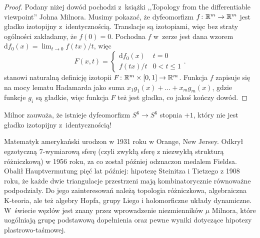\begin{proof}
    Podany niżej dowód pochodzi z~książki ,,Topology from the differentiable viewpoint'' Johna Milnora.
%
    Musimy pokazać, że dyfeomorfizm $f \colon \mathbb R^m \to \mathbb R^m$ jest gładko izotopijny z~identycznością.
    Translacje są izotopiami, więc bez straty ogólności zakładamy, że $f(0) = 0$.
    Pochodna $f$ w~zerze jest dana wzorem $\mathrm{d}f_0(x) = \lim_{t \to 0} f(tx) /t$, więc
    \begin{equation}
        F(x, t) = \begin{cases}
            \mathrm{d}f_0(x) & t = 0 \\
            f(tx) / t & 0 < t \le 1
        \end{cases} .
    \end{equation}
    stanowi naturalną definicję izotopii $F \colon \mathbb R^m \times [0, 1] \to \mathbb R^m$.
    Funkcja $f$ zapisuje się na mocy lematu Hadamarda jako suma $x_1 g_1(x) + \ldots + x_mg_m(x)$, gdzie funkcje $g_i$ są gładkie, więc funkcja $F$ też jest gładka, co jakoś kończy dowód.
%    
\end{proof}

Milnor zauważa, że istnieje dyfeomorfizm $S^6 \to S^6$ stopnia $+1$, który nie jest gładko izotopijny z~identycznością!
%

\begin{remark}
    Matematyk amerykański urodzon w 1931 roku w Orange, New Jersey.
    Odkrył egzotyczną 7-wymiarową sferę (czyli zwykłą sferę z niezwykłą strukturą różniczkową) w 1956 roku, za co został później odznaczon medalem Fieldsa.
    Obalił Hauptvermutung pięć lat później: hipotezę Steinitza i Tietzego z 1908 roku, że każde dwie triangulacje przestrzeni mają kombinatorycznie równoważne podpodziały.
    Do jego zainteresowań należą topologia różniczkowa, algebraiczna K-teoria, ale też algebry Hopfa, grupy Liego i holomorficzne układy dynamiczne.
    W~świecie węzłów jest znany przez wprowadzenie niezmienników $\mu$ Milnora, które uogólniają grupę podstawową dopełnienia oraz pewne wyniki dotyczące hipotezy plastrowo-taśmowej.
\end{remark}
%
%
%

